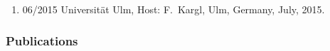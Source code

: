 \begin{enumerate}
\item 06/2015 Universit\"at Ulm, Host: F.~Kargl, Ulm, Germany, July, 2015.
\end{enumerate}


\subsubsection{Publications}

